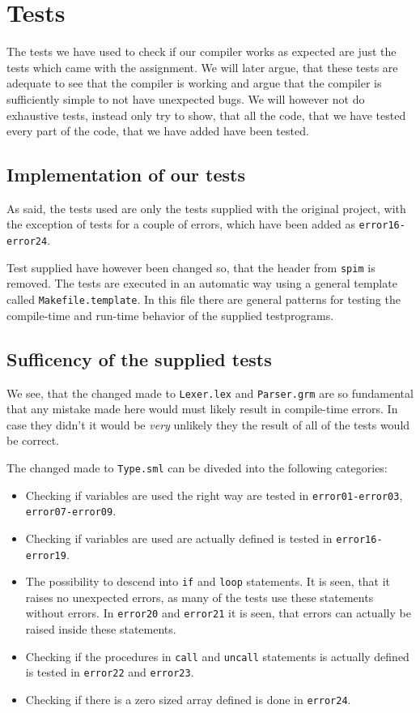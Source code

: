 \section{Tests}

The tests we have used to check if our compiler works as expected are
just the tests which came with the assignment. We will later argue, that
these tests are adequate to see that the compiler is working and argue that
the compiler is sufficiently simple to not have unexpected bugs. We will
however not do exhaustive tests, instead only try to show, that all the code,
that we have tested every part of the code, that we have added have been
tested.

\subsection{Implementation of our tests}
As said, the tests used are only the tests supplied with the original project,
with the exception of tests for a couple of errors, which have been added as
{\tt error16-error24}.

Test supplied have however been changed so, that the header from {\tt spim} is
removed. The tests are executed in an automatic way using a general template
called {\tt Makefile.template}. In this file there are general patterns for
testing the compile-time and run-time behavior of the supplied testprograms.

\subsection{Sufficency of the supplied tests}
We see, that the changed made to {\tt Lexer.lex} and {\tt Parser.grm} are
so fundamental that any mistake made here would must likely result in
compile-time errors. In case they didn't it would be \emph{very} unlikely
they the result of all of the tests would be correct.

The changed made to {\tt Type.sml} can be diveded into the following categories:
\begin{itemize}
\item Checking if variables are used the right way are tested in {\tt error01-error03}, {\tt error07-error09}.
\item Checking if variables are used are actually defined is tested in {\tt error16-error19}.
\item The possibility to descend into {\tt if} and {\tt loop} statements.
      It is seen, that it raises no unexpected errors, as many of the tests use
      these statements without errors. In {\tt error20} and {\tt error21} it is
      seen, that errors can actually be raised inside these statements.
\item Checking if the procedures in {\tt call} and {\tt uncall} statements is actually
      defined is tested in {\tt error22} and {\tt error23}.
\item Checking if there is a zero sized array defined is done in {\tt error24}.
\end{itemize}

